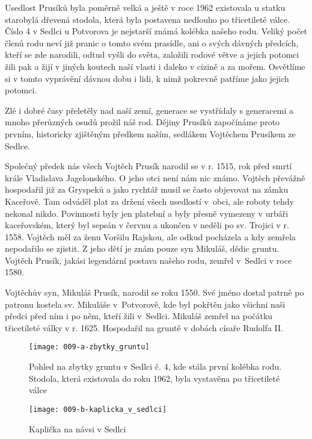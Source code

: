 \documentclass[../dejiny-rodu-prusiku.tex]{subfiles}
\begin{document}
Usedlost Prusíků byla poměrně velká a ještě v roce 1962 existovala u statku starobylá dřevená stodola, která by­la postavena nedlouho po třicetileté válce. Číslo 4 v Sedlci u Potvorova je nejstarší známá kolébka našeho ro­du. Veliký počet členů rodu neví již pranic o tomto svém prasídle, ani o svých dávných předcích, kteří se zde na­rodili, odtud vyšli do světa, založili rodové větve a jejich potomci žili pak a žijí v jiných koutech naší vlasti i daleko v cizině a za mořem. Osvětlíme si v tomto vyprávění dávnou dobu i lidi, k nimž pokrevně patříme ja­ko jejich potomci.

Zlé i dobré časy přeletěly nad naší zemí, generace se vystřídaly s generacemi a mnoho přerůzných osudů prožil náš rod. Dějiny Prusíků započínáme proto prvním, historicky zjištěným předkem naším, sedlákem Vojtěchem Prusíkem ze Sedlce.

Společný předek nás všech  Vojtěch  Prusík  narodil se v r. 1515, rok před smrtí krále Vladislava Jagelonského. O jeho otci není nám nic známo. Vojtěch převážně hospodařil již za Gryspeků a jako rychtář musil se často objevovat na zámku Kaceřově. Tam odváděl plat za držení všech usedlostí v~obci, ale roboty tehdy nekonal nikdo. Povinnosti byly jen platební a byly přesně vymezeny v urbáři kaceřovském, který byl sepsán v červnu a ukončen v neděli po sv. Trojici v r. 1558. Vojtěch měl za ženu Voršilu Rajskou, ale odkud pocháze­la a kdy zemřela nepodařilo se zjistit. Z jeho dětí je znám pouze syn Mikuláš, dědic gruntu. Vojtěch Prusík, jakási legendární postava našeho rodu, zemřel v~Sedlci v roce 1580.

Vojtěchův syn, Mikuláš Prusík, narodil se roku 1550. Své jméno dostal patrně po patronu kostela sv. Mikuláše v~Potvorově, kde byl pokřtěn jako všichni naši předci před ním i po něm, kteří žili v~Sedlci. Mikuláš zemřel na počátku třicetileté války v r. 1625. Hospodařil na gruntě v dobách císaře Rudolfa II.


\begin{figure}
\centering
\texttt{[image: 009-a-zbytky\_gruntu]}
\caption{Pohled na zbytky gruntu v Sedlci č. 4, kde stála první kolébka rodu. Stodola, která existovala do roku 1962, byla vystavěna po třicetileté válce}
\label{fig: 009-a-zbytky_gruntu}
\end{figure}

\begin{figure}
\centering
\texttt{[image: 009-b-kaplicka\_v\_sedlci]}
\caption{Kaplička na návsi v Sedlci}
\label{fig: 009-b-kaplicka_v_sedlci}
\end{figure}
\end{document}
